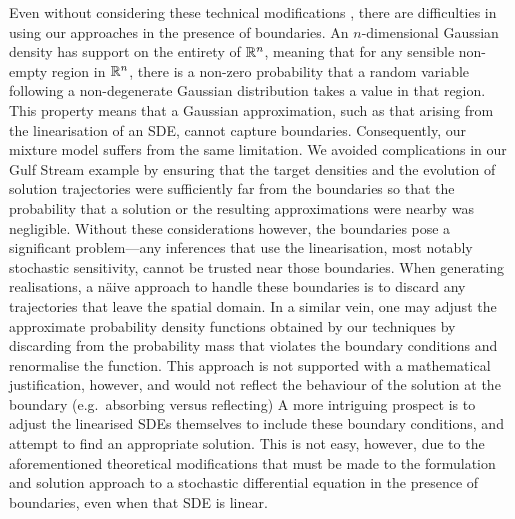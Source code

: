 Even without considering these technical modifications , there are difficulties in using our approaches in the presence of boundaries.
An \(n\)-dimensional Gaussian density has support on the entirety of \(\mathbb{R}^n\), meaning that for any sensible non-empty region in \(\mathbb{R}^n\), there is a non-zero probability that a random variable following a non-degenerate Gaussian distribution takes a value in that region.
This property means that a Gaussian approximation, such as that arising from the linearisation of an SDE, cannot capture boundaries.
Consequently, our mixture model suffers from the same limitation.
We avoided complications in our Gulf Stream example by ensuring that the target densities and the evolution of solution trajectories were sufficiently far from the boundaries so that the probability that a solution or the resulting approximations were nearby was negligible.
Without these considerations however, the boundaries pose a significant problem---any inferences that use the linearisation, most notably stochastic sensitivity, cannot be trusted near those boundaries.
When generating realisations, a n\"aive approach to handle these boundaries is to discard any trajectories that leave the spatial domain.
In a similar vein, one may adjust the approximate probability density functions obtained by our techniques by discarding from the probability mass that violates the boundary conditions and renormalise the function.
This approach is not supported with a mathematical justification, however, and would not reflect the behaviour of the solution at the boundary (e.g.\ absorbing versus reflecting)
A more intriguing prospect is to adjust the linearised SDEs themselves to include these boundary conditions, and attempt to find an appropriate solution.
This is not easy, however, due to the aforementioned theoretical modifications that must be made to the formulation and solution approach to a stochastic differential equation in the presence of boundaries, even when that SDE is linear.



